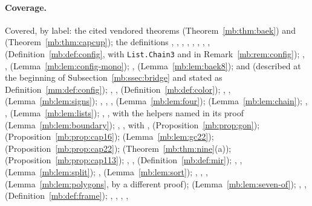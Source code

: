 \paragraph{Coverage.}
Covered, by label: the cited vendored theorems  (Theorem~\ref{mb:thm:baek}) and 
(Theorem~\ref{mb:thm:capcup}); the definitions , , , ,
, , , , 
(Definition~\ref{mb:def:config}, with \texttt{List.Chain3\textquotesingle} and  in Remark~\ref{mb:rem:config});
, , 
(Lemma~\ref{mb:lem:config-mono}); ,  (Lemma~\ref{mb:lem:baek8});
 and  (described at the beginning of Subsection~\ref{mb:ssec:bridge} and
stated as Definition~\ref{mm:def:config});
, ,  (Definition~\ref{mb:def:color}); ,
,  (Lemma~\ref{mb:lem:signs}); ,
, ,  (Lemma~\ref{mb:lem:four});
 (Lemma~\ref{mb:lem:chain}); , , 
(Lemma~\ref{mb:lem:lists}); , ,  with the
helpers named in its proof (Lemma~\ref{mb:lem:boundary}); , ,
 with ,  (Proposition~\ref{mb:prop:gon});
 (Proposition~\ref{mb:prop:cap16});  (Lemma~\ref{mb:lem:gc22});
 (Proposition~\ref{mb:prop:cap22});  (Theorem~\ref{mb:thm:nine}(a));
 (Proposition~\ref{mb:prop:cap113}); , , 
(Definition~\ref{mb:def:mir}); , ,  (Lemma~\ref{mb:lem:split});
,  (Lemma~\ref{mb:lem:sort}); , ,
,  (Lemma~\ref{mb:lem:polygons}, by a different proof);
 (Lemma~\ref{mb:lem:seven-of}); , , 
(Definition~\ref{mb:def:frame}); , , , ,
